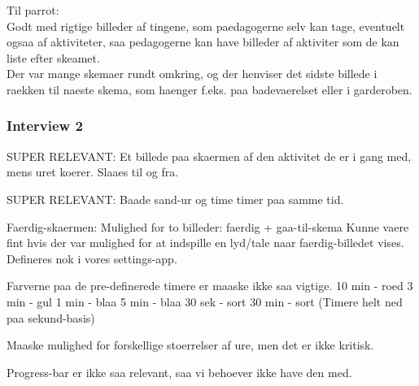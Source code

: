 Til parrot:\\
Godt med rigtige billeder af tingene, som paedagogerne selv kan tage, eventuelt ogsaa af aktiviteter, saa pedagogerne kan have billeder af aktiviter som de kan liste efter skeamet.\\

Der var mange skemaer rundt omkring, og der henviser det sidste billede i raekken til naeste skema, som haenger f.eks. paa badevaerelset eller i garderoben.

\subsubsection*{Interview 2}
SUPER RELEVANT:
Et billede paa skaermen af den aktivitet de er i gang med, mens uret koerer. Slaaes til og fra.

SUPER RELEVANT:
Baade sand-ur og time timer paa samme tid. 

Faerdig-skaermen:
Mulighed for to billeder: faerdig + gaa-til-skema
   Kunne vaere fint hvis der var mulighed for at indspille en lyd/tale naar faerdig-billedet vises. Defineres nok i vores settings-app.

Farverne paa de pre-definerede timere er maaske ikke saa vigtige.
10 min - roed
3 min - gul
1 min - blaa
5 min - blaa
30 sek - sort
30 min - sort
(Timere helt ned paa sekund-basis)

Maaske mulighed for forskellige stoerrelser af ure, men det er ikke kritisk.

Progress-bar er ikke saa relevant, saa vi behoever ikke have den med.